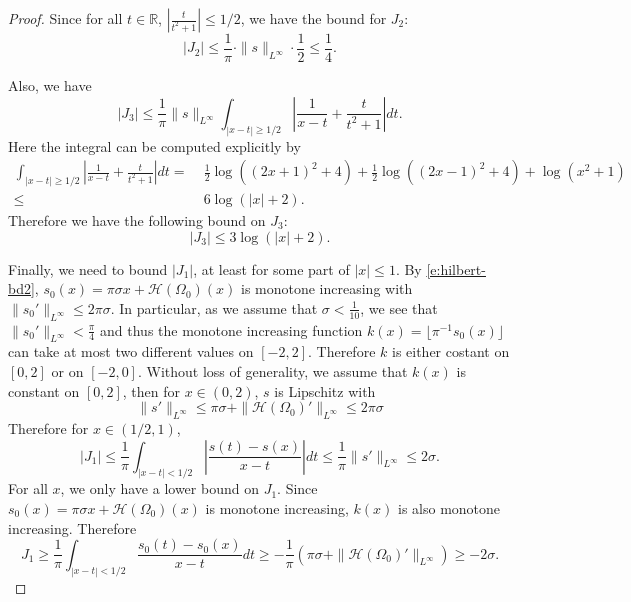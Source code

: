\documentclass[reqno,12pt,letterpaper]{amsart}
\numberwithin{equation}{section}
\numberwithin{prop}{section}
\begin{document}
\begin{proof}
Since for all $t\in\mathbb{R}$, $\left|\frac{t}{t^2+1}\right|\leq 1/2$, we have the bound for $J_2$:
\begin{equation}
\label{e:j2}
|J_2|\leq\frac{1}{\pi}\cdot\|s\|_{L^\infty}\cdot\frac{1}{2}\leq\frac{1}{4}.
\end{equation}

Also, we have
\begin{equation*}
|J_3|\leq\frac{1}{\pi}\|s\|_{L^\infty}\int_{|x-t|\geq1/2}
\left|\frac{1}{x-t}+\frac{t}{t^2+1}\right|dt.
\end{equation*}
Here the integral can be computed explicitly by
\begin{equation*}
\begin{split}
\int_{|x-t|\geq1/2}
\left|\frac{1}{x-t}+\frac{t}{t^2+1}\right|dt
=&\;\frac{1}{2}\log((2x+1)^2+4)+\frac{1}{2}\log((2x-1)^2+4)+\log(x^2+1)\\
\leq&\; 6\log(|x|+2).
\end{split}
\end{equation*}
Therefore we have the following bound on $J_3$:
\begin{equation}
\label{e:j3}
|J_3|\leq 3\log(|x|+2).
\end{equation}

Finally, we need to bound $|J_1|$, at least for some part of $|x|\leq 1$. By \eqref{e:hilbert-bd2}, $s_0(x)=\pi\sigma x+\mathcal{H}(\Omega_0)(x)$ is monotone increasing with $\|s_0'\|_{L^\infty}\leq 2\pi\sigma$. In particular, as we assume that $\sigma<\frac{1}{10}$, we see that $\|s_0'\|_{L^\infty}<\frac{\pi}{4}$ and thus the monotone increasing function $k(x)=\lfloor \pi^{-1}s_0(x)\rfloor$ can take at most two different values on $[-2,2]$. Therefore $k$ is either costant on $[0,2]$ or on $[-2,0]$. Without loss of generality, we assume that $k(x)$ is constant on $[0,2]$, then for $x\in(0,2)$, $s$ is Lipschitz with
\begin{equation*}
\|s'\|_{L^\infty}\leq \pi\sigma+\|\mathcal{H}(\Omega_0)'\|_{L^\infty}
\leq 2\pi\sigma
\end{equation*}
Therefore for $x\in(1/2,1)$, 
\begin{equation}
\label{e:j1-bd-1}
|J_1|\leq\frac{1}{\pi}\int_{|x-t|<1/2}\left|\frac{s(t)-s(x)}{x-t}\right|dt
\leq\frac{1}{\pi}\|s'\|_{L^\infty}\leq 2\sigma.
\end{equation}
For all $x$, we only have a lower bound on $J_1$. Since $s_0(x)=\pi\sigma x+\mathcal{H}(\Omega_0)(x)$ is monotone increasing, $k(x)$ is also monotone increasing. Therefore
\begin{equation}
\label{e:j1-bd-2}
J_1\geq\frac{1}{\pi}\int_{|x-t|<1/2}\frac{s_0(t)-s_0(x)}{x-t}dt
\geq-\frac{1}{\pi}(\pi\sigma+\|\mathcal{H}(\Omega_0)'\|_{L^\infty})
\geq-2\sigma.
\end{equation}


\end{proof}
\end{document}
